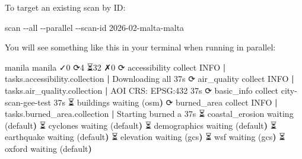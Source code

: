 \documentclass[
  letterpaper,
  DIV=11,
  numbers=noendperiod]{scrreprt}
\newenvironment{Shaded}{\begin{snugshade}}{\end{snugshade}}
\newcommand{\AttributeTok}[1]{\textcolor[rgb]{0.40,0.45,0.13}{#1}}
\newcommand{\ErrorTok}[1]{\textcolor[rgb]{0.68,0.00,0.00}{#1}}
\newcommand{\ExtensionTok}[1]{\textcolor[rgb]{0.00,0.23,0.31}{#1}}
\newcommand{\KeywordTok}[1]{\textcolor[rgb]{0.00,0.23,0.31}{\textbf{#1}}}
\newcommand{\NormalTok}[1]{\textcolor[rgb]{0.00,0.23,0.31}{#1}}
\begin{document}
To target an existing scan by ID:

\begin{Shaded}
\begin{Highlighting}[]
\ExtensionTok{scan} \AttributeTok{{-}{-}all} \AttributeTok{{-}{-}parallel} \AttributeTok{{-}{-}scan{-}id}\NormalTok{ 2026{-}02{-}malta{-}malta}
\end{Highlighting}
\end{Shaded}

You will see something like this in your terminal when running in
parallel:

\begin{Shaded}
\begin{Highlighting}[]
\ExtensionTok{manila}\NormalTok{  manila  ✓0  ⟳4  ⏳32  ✗0}
 \ExtensionTok{⟳}\NormalTok{  accessibility      collect  INFO }\KeywordTok{|} \ExtensionTok{tasks.accessibility.collection} \KeywordTok{|} \ExtensionTok{Downloading}\NormalTok{ all     37s                             }
 \ExtensionTok{⟳}\NormalTok{  air\_quality        collect  INFO }\KeywordTok{|} \ExtensionTok{tasks.air\_quality.collection} \KeywordTok{|} \ExtensionTok{AOI}\NormalTok{ CRS: EPSG:432     37s}
 \ExtensionTok{⟳}\NormalTok{  basic\_info         collect  city{-}scan{-}gee{-}test                                37s}
 \ExtensionTok{⏳}\NormalTok{ buildings                   waiting }\ErrorTok{(}\ExtensionTok{osm}\KeywordTok{)}                                        
 \ExtensionTok{⟳}\NormalTok{  burned\_area        collect  INFO }\KeywordTok{|} \ExtensionTok{tasks.burned\_area.collection} \KeywordTok{|} \ExtensionTok{Starting}\NormalTok{ burned a     37s}
 \ExtensionTok{⏳}\NormalTok{ coastal\_erosion             waiting }\ErrorTok{(}\ExtensionTok{default}\KeywordTok{)}                                    
 \ExtensionTok{⏳}\NormalTok{ cyclones                    waiting }\ErrorTok{(}\ExtensionTok{default}\KeywordTok{)}                                    
 \ExtensionTok{⏳}\NormalTok{ demographics                waiting }\ErrorTok{(}\ExtensionTok{default}\KeywordTok{)}                                    
 \ExtensionTok{⏳}\NormalTok{ earthquake                  waiting }\ErrorTok{(}\ExtensionTok{default}\KeywordTok{)}                                    
 \ExtensionTok{⏳}\NormalTok{ elevation                   waiting }\ErrorTok{(}\ExtensionTok{gcs}\KeywordTok{)}                                        
 \ExtensionTok{⏳}\NormalTok{ wsf                         waiting }\ErrorTok{(}\ExtensionTok{gcs}\KeywordTok{)}                                        
 \ExtensionTok{⏳}\NormalTok{ oxford                      waiting }\ErrorTok{(}\ExtensionTok{default}\KeywordTok{)}                                    

\end{Highlighting}
\end{Shaded}
\end{document}
